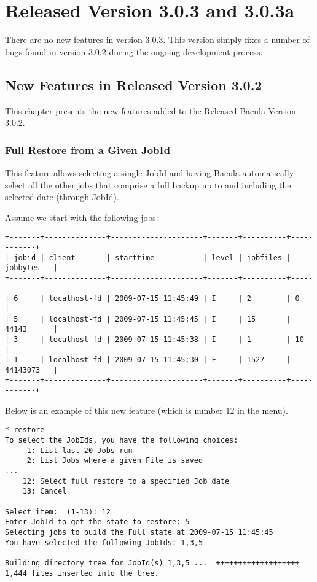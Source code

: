 \chapter{Released Version 3.0.3 and 3.0.3a}

There are no new features in version 3.0.3.  This version simply fixes a
number of bugs found in version 3.0.2 during the ongoing development
process.

\section{New Features in Released Version 3.0.2}

This chapter presents the new features added to the
Released Bacula Version 3.0.2.

\subsection{Full Restore from a Given JobId}

This feature allows selecting a single JobId and having Bacula
automatically select all the other jobs that comprise a full backup up to
and including the selected date (through JobId).

Assume we start with the following jobs:
\begin{verbatim}
+-------+--------------+---------------------+-------+----------+------------+
| jobid | client       | starttime           | level | jobfiles | jobbytes   |
+-------+--------------+---------------------+-------+----------+------------
| 6     | localhost-fd | 2009-07-15 11:45:49 | I     | 2        | 0          |
| 5     | localhost-fd | 2009-07-15 11:45:45 | I     | 15       | 44143      |
| 3     | localhost-fd | 2009-07-15 11:45:38 | I     | 1        | 10         |
| 1     | localhost-fd | 2009-07-15 11:45:30 | F     | 1527     | 44143073   |
+-------+--------------+---------------------+-------+----------+------------+
\end{verbatim}

Below is an example of this new feature (which is number 12 in the
menu).

\begin{verbatim}
* restore
To select the JobIds, you have the following choices:
     1: List last 20 Jobs run
     2: List Jobs where a given File is saved
...
    12: Select full restore to a specified Job date
    13: Cancel

Select item:  (1-13): 12
Enter JobId to get the state to restore: 5
Selecting jobs to build the Full state at 2009-07-15 11:45:45
You have selected the following JobIds: 1,3,5

Building directory tree for JobId(s) 1,3,5 ...  +++++++++++++++++++
1,444 files inserted into the tree.
\end{verbatim}

